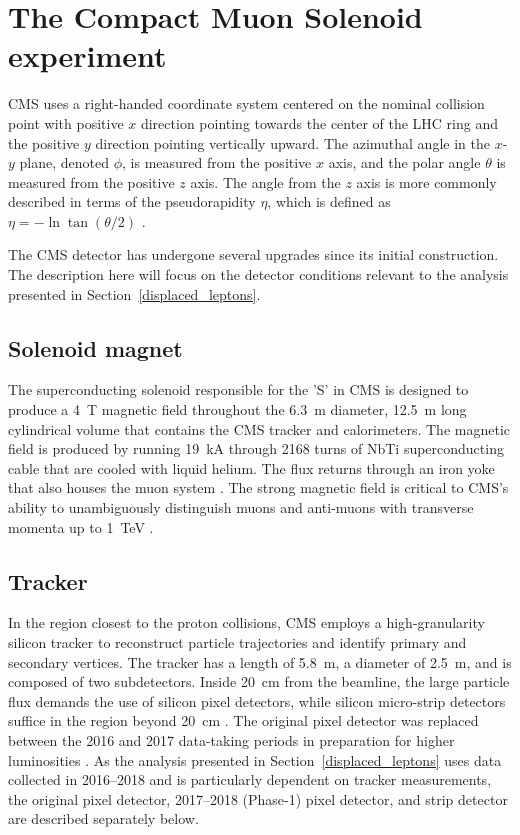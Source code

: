 \section{The Compact Muon Solenoid experiment}

CMS uses a right-handed coordinate system centered on the nominal collision point with positive $x$ direction pointing towards the center of the LHC ring and the positive $y$ direction pointing vertically upward. The azimuthal angle in the $x$-$y$ plane, denoted $\phi$, is measured from the positive $x$ axis, and the polar angle $\theta$ is measured from the positive $z$ axis. The angle from the $z$ axis is more commonly described in terms of the pseudorapidity $\eta$, which is defined as $\eta=-\ln\tan(\theta/2)$ \cite{cms_tdr_v1}.

The CMS detector has undergone several upgrades since its initial construction. The description here will focus on the detector conditions relevant to the analysis presented in Section~\ref{displaced_leptons}.

\subsection{Solenoid magnet}
The superconducting solenoid responsible for the 'S' in CMS is designed to produce a \SI{4}{\tesla} magnetic field throughout the \SI{6.3}{\metre} diameter, \SI{12.5}{\metre} long cylindrical volume  that contains the CMS tracker and calorimeters. The magnetic field is produced by running \SI{19}{\kA} through 2168 turns of NbTi superconducting cable that are cooled with liquid helium. The flux returns through an iron yoke that also houses the muon system \cite{cms_experiment}. The strong magnetic field is critical to CMS's ability to unambiguously distinguish muons and anti-muons with transverse momenta up to \SI{1}{\TeV} \cite{cms_tdr_v1}.

\subsection{Tracker}
\label{tracker}
In the region closest to the proton collisions, CMS employs a high-granularity silicon tracker to reconstruct particle trajectories and identify primary and secondary vertices. The tracker has a length of \SI{5.8}{\m}, a diameter of \SI{2.5}{\m}, and is composed of two subdetectors. Inside \SI{20}{\cm} from the beamline, the large particle flux demands the use of silicon pixel detectors, while silicon micro-strip detectors suffice in the region beyond \SI{20}{\cm} \cite{cms_experiment}. The original pixel detector was replaced between the 2016 and 2017 data-taking periods in preparation for higher luminosities \cite{cms_phase1_pixels}. As the analysis presented in Section~\ref{displaced_leptons} uses data collected in 2016--2018 and is particularly dependent on tracker measurements, the original pixel detector, 2017--2018 (Phase-1) pixel detector, and strip detector are described separately below. 

